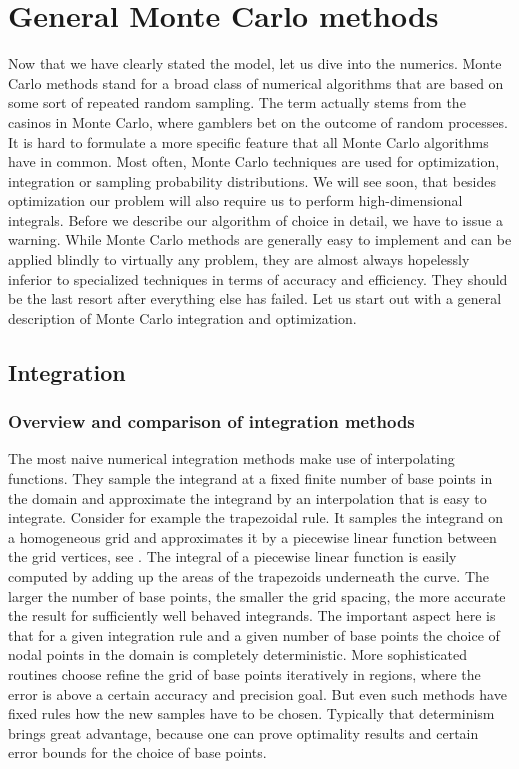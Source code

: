 \section{General Monte Carlo methods}\label{sec:mctheory}
%
Now that we have clearly stated the model, let us dive into the numerics. Monte
Carlo methods stand for a broad class of numerical algorithms that are based on
some sort of repeated random sampling. The term actually stems from the casinos
in Monte Carlo, where gamblers bet on the outcome of random processes. It is
hard to formulate a more specific feature that all Monte Carlo algorithms have
in common. Most often, Monte Carlo techniques are used for optimization,
integration or sampling probability distributions. We will see soon, that
besides optimization our problem will also require us to perform
high-dimensional integrals. Before we describe our algorithm of choice in
detail, we have to issue a warning. While Monte Carlo methods are generally easy
to implement and can be applied blindly to virtually any problem, they are
almost always hopelessly inferior to specialized techniques in terms of accuracy
and efficiency. They should be the last resort after everything else has failed.
Let us start out with a general description of Monte Carlo integration and
optimization.

\subsection{Integration}

\subsubsection{Overview and comparison of integration methods}

The most naive numerical integration methods make use of interpolating
functions. They sample the integrand at a fixed finite number of base points in
the domain and approximate the integrand by an interpolation that is easy to
integrate. Consider for example the trapezoidal rule. It samples the integrand
on a homogeneous grid and approximates it by a piecewise linear function between
the grid vertices, see . The integral of a piecewise linear
function is easily computed by adding up the areas of the trapezoids underneath
the curve. The larger the number of base points, \ie{} the smaller the grid
spacing, the more accurate the result for sufficiently well behaved integrands.
The important aspect here is that for a given integration rule and a given
number of base points the choice of nodal points in the domain is completely
deterministic. More sophisticated routines choose refine the grid of base points
iteratively in regions, where the error is above a certain accuracy and
precision goal. But even such  methods have fixed rules how
the new samples have to be chosen. Typically that determinism brings great
advantage, because one can prove optimality results and certain error bounds for
the choice of base points.

